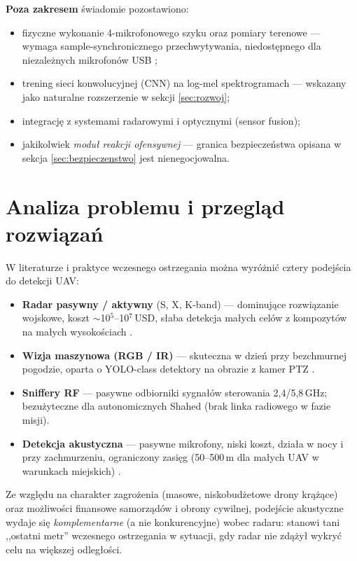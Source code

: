 \documentclass[11pt,a4paper]{article}
\newcommand{\sectionref}[1]{sekcja \ref{#1}}
\begin{document}
\textbf{Poza zakresem} świadomie pozostawiono:
\begin{itemize}[noitemsep]
  \item fizyczne wykonanie 4-mikrofonowego szyku oraz pomiary terenowe ---
        wymaga sample-synchronicznego przechwytywania, niedostępnego dla
        niezależnych mikrofonów USB \cite{respeaker};
  \item trening sieci konwolucyjnej (CNN) na log-mel spektrogramach ---
        wskazany jako naturalne rozszerzenie w sekcji \ref{sec:rozwoj};
  \item integrację z systemami radarowymi i optycznymi (sensor fusion);
  \item jakikolwiek \emph{moduł reakcji ofensywnej} --- granica bezpieczeństwa
        opisana w \sectionref{sec:bezpieczenstwo} jest nienegocjowalna.
\end{itemize}

\section{Analiza problemu i przegląd rozwiązań}

W literaturze i praktyce wczesnego ostrzegania można wyróżnić cztery podejścia
do detekcji UAV:
\begin{itemize}[noitemsep]
  \item \textbf{Radar pasywny / aktywny} (S, X, K-band) --- dominujące rozwiązanie
        wojskowe, koszt $\sim$10$^5$--10$^7$\,USD, słaba detekcja małych celów z
        kompozytów na małych wysokościach \cite{drone_radar_review}.
  \item \textbf{Wizja maszynowa (RGB / IR)} --- skuteczna w dzień przy
        bezchmurnej pogodzie, oparta o YOLO-class detektory na obrazie z
        kamer PTZ \cite{drone_vision}.
  \item \textbf{Sniffery RF} --- pasywne odbiorniki sygnałów sterowania
        2{,}4/5{,}8\,GHz; bezużyteczne dla autonomicznych Shahed (brak linka
        radiowego w fazie misji).
  \item \textbf{Detekcja akustyczna} --- pasywne mikrofony, niski koszt, działa
        w nocy i przy zachmurzeniu, ograniczony zasięg (50--500\,m dla małych
        UAV w warunkach miejskich) \cite{drone_acoustic_park, drone_acoustic_bernardini}.
\end{itemize}

Ze względu na charakter zagrożenia (masowe, niskobudżetowe drony krążące) oraz
możliwości finansowe samorządów i obrony cywilnej, podejście akustyczne wydaje
się \emph{komplementarne} (a nie konkurencyjne) wobec radaru: stanowi tani
,,ostatni metr'' wczesnego ostrzegania w sytuacji, gdy radar nie zdążył wykryć
celu na większej odległości.
\end{document}

